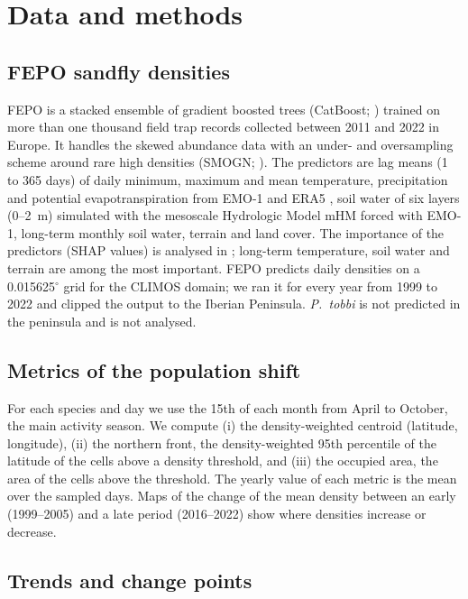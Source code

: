 \documentclass[pdflatex,sn-basic]{sn-jnl}
\newcommand{\spn}[1]{\textit{#1}}
\begin{document}
\section{Data and methods}\label{sec:methods}

\subsection{FEPO sandfly densities}

FEPO \citep{Soheili2025} is a stacked ensemble of gradient boosted trees (CatBoost; \citealp{Prokhorenkova2018}) trained on more than one thousand field trap records collected between 2011 and 2022 in Europe. It handles the skewed abundance data with an under- and oversampling scheme around rare high densities (SMOGN; \citealp{Branco2017}). The predictors are lag means (1 to 365 days) of daily minimum, maximum and mean temperature, precipitation and potential evapotranspiration from EMO-1 \citep{Thiemig2022} and ERA5 \citep{Hersbach2020}, soil water of six layers (0--2~m) simulated with the mesoscale Hydrologic Model mHM \citep{Samaniego2010, Kumar2013} forced with EMO-1, long-term monthly soil water, terrain and land cover. The importance of the predictors (SHAP values) is analysed in \citet{Soheili2025}; long-term temperature, soil water and terrain are among the most important. FEPO predicts daily densities on a 0.015625$^\circ$ grid for the CLIMOS domain; we ran it for every year from 1999 to 2022 and clipped the output to the Iberian Peninsula. \spn{P.~tobbi} is not predicted in the peninsula and is not analysed.

\subsection{Metrics of the population shift}

For each species and day we use the 15th of each month from April to October, the main activity season. We compute (i) the density-weighted centroid (latitude, longitude), (ii) the northern front, the density-weighted 95th percentile of the latitude of the cells above a density threshold, and (iii) the occupied area, the area of the cells above the threshold. The yearly value of each metric is the mean over the sampled days. Maps of the change of the mean density between an early (1999--2005) and a late period (2016--2022) show where densities increase or decrease.

\subsection{Trends and change points}
\end{document}
